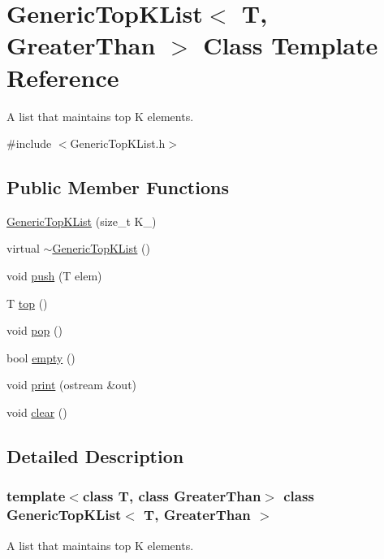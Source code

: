 \hypertarget{class_generic_top_k_list}{
\section{GenericTopKList$<$ T, GreaterThan $>$ Class Template Reference}
\label{class_generic_top_k_list}
}


A list that maintains top K elements.  




{\ttfamily \#include $<$GenericTopKList.h$>$}

\subsection*{Public Member Functions}
\begin{DoxyCompactItemize}
\item 
\hyperlink{class_generic_top_k_list_a18a193d1dfb006dcf3bdbde105a8838a}{GenericTopKList} (size\_\-t K\_)
\item 
virtual \hyperlink{class_generic_top_k_list_aed78c2fb73928c49c69deec86d8233d2}{$\sim$GenericTopKList} ()
\item 
void \hyperlink{class_generic_top_k_list_a6ab837a0bcd3f93a543f2cf6a6bc2ce3}{push} (T elem)
\item 
T \hyperlink{class_generic_top_k_list_a5ad239650c74d5545d24123ea181728e}{top} ()
\item 
void \hyperlink{class_generic_top_k_list_a0d65002433e3b2707c6966c3c86b9bbb}{pop} ()
\item 
bool \hyperlink{class_generic_top_k_list_aaab77d173b58c924ea81bb5c8fead8d5}{empty} ()
\item 
void \hyperlink{class_generic_top_k_list_a055c25c654e83e69b7db1f3247b169a3}{print} (ostream \&out)
\item 
void \hyperlink{class_generic_top_k_list_a98580415dbb972ff050d31f16cfa6298}{clear} ()
\end{DoxyCompactItemize}


\subsection{Detailed Description}
\subsubsection*{template$<$class T, class GreaterThan$>$ class GenericTopKList$<$ T, GreaterThan $>$}

A list that maintains top K elements. 

